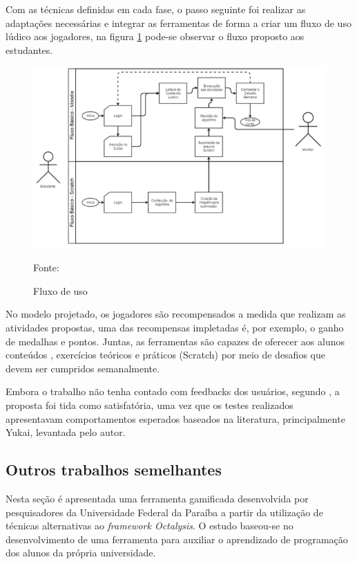 \pagebreak

Com as técnicas definidas em cada fase, o passo seguinte foi realizar as adaptações necessárias e integrar as ferramentas de forma a criar
um fluxo de uso lúdico aos jogadores, na figura \ref{fluxo} pode-se observar o fluxo proposto aos estudantes.

\begin{figure}[h]
	\centering
	\includegraphics[keepaspectratio=true,scale=0.55]{figuras/fluxo.png}
	\caption{Fluxo de uso}
	Fonte: \cite{wilker}
	\label{fluxo}
\end{figure}

No modelo projetado, os jogadores são recompensados a medida que realizam as atividades propostas, uma das recompensas
impletadas é, por exemplo, o ganho de medalhas e pontos. Juntas, as ferramentas são capazes de oferecer aos alunos conteúdos 
, exercícios teóricos e práticos (Scratch) por meio de desafios que devem ser cumpridos semanalmente.

Embora o trabalho não tenha contado com feedbacks dos usuários, segundo , a proposta foi tida
como satisfatória, uma vez que os testes realizados apresentavam comportamentos esperados baseados na literatura, principalmente
Yukai, levantada pelo autor.

\subsection{Outros trabalhos semelhantes}
Nesta seção é apresentada uma ferramenta gamificada desenvolvida por pesquisadores da Universidade Federal da Paraíba a partir 
da utilização de técnicas alternativas ao \textit{framework Octalysis}. O estudo baseou-se no desenvolvimento de uma ferramenta para
auxiliar o aprendizado de programação dos alunos da própria universidade.

